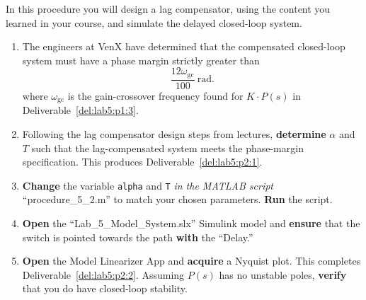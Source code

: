 \begin{procedure}[label={proc:lab5:2}]
  In this procedure you will design a lag compensator, using the content you learned in your course, and simulate the delayed closed-loop system.
  \begin{enumerate}[label={(\arabic*)}]
    \item{%
      The engineers at VenX have determined that the compensated closed-loop system must have a phase margin strictly greater than
      \[
        \frac{12\omega_\mathrm{gc}}{100}~\mathrm{rad}.
      \]
      where \(\omega_\mathrm{gc}\) is the gain-crossover frequency
      found for \(K \cdot P(s)\) in Deliverable~\ref{del:lab5:p1:3}.
      }
    \item{%
      Following the lag compensator design steps from lectures, \textbf{determine} \(\alpha\) and \(T\) such that the lag-compensated system meets the phase-margin specification.
      This produces Deliverable~\ref{del:lab5:p2:1}.
    }
    \item{%
      \textbf{Change} the variable \texttt{alpha} and \texttt{T} \emph{in the MATLAB script} ``procedure\_5\_2.m'' to match your chosen parameters.
      \textbf{Run} the script.
    }
    \item{%
      \textbf{Open} the ``Lab\_5\_Model\_System.slx'' Simulink model and \textbf{ensure} that the switch is pointed towards the path \textbf{with} the ``Delay.''
    }
    \item{%
      \textbf{Open} the Model Linearizer App and \textbf{acquire} a Nyquist plot.
      This completes Deliverable~\ref{del:lab5:p2:2}.
      Assuming \(P(s)\) has no unstable poles, \textbf{verify} that you do  have closed-loop stability.
    }
  \end{enumerate}
\end{procedure}

